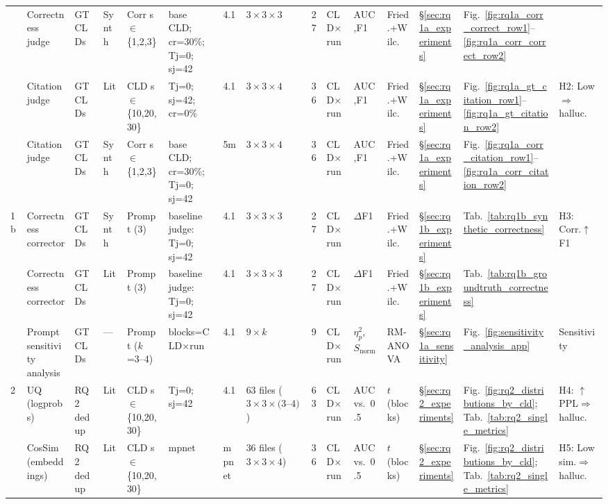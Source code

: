 \begin{landscape}
\begin{table}[H]
{\begin{tabular}{@{}l l l l l l l l c l l l l l l@{}}
  & Correctness judge & GT CLDs & Synth & Corr s$\in$\{1,2,3\} & base CLD; cr=30\%; Tj=0; sj=42 & 4.1 & $3\times3\times3$ & 27 & CLD$\times$run & AUC,F1 & Fried.+Wilc. & \S\ref{sec:rq1a_experiments} & Fig.~\ref{fig:rq1a_corr_correct_row1}--\ref{fig:rq1a_corr_correct_row2} & \\
  & Citation judge & GT CLDs & Lit & CLD s$\in$\{10,20,30\} & Tj=0; sj=42; cr=0\% & 4.1 & $3\times3\times4$ & 36 & CLD$\times$run & AUC,F1 & Fried.+Wilc. & \S\ref{sec:rq1a_experiments} & Fig.~\ref{fig:rq1a_gt_citation_row1}--\ref{fig:rq1a_gt_citation_row2} & \multirow{2}{*}{H2: Low$\Rightarrow$halluc.} \\
  & Citation judge & GT CLDs & Synth & Corr s$\in$\{1,2,3\} & base CLD; cr=30\%; Tj=0; sj=42 & 5m & $3\times3\times4$ & 36 & CLD$\times$run & AUC,F1 & Fried.+Wilc. & \S\ref{sec:rq1a_experiments} & Fig.~\ref{fig:rq1a_corr_citation_row1}--\ref{fig:rq1a_corr_citation_row2} & \\
\midrule
\multirow{2}{*}{1b}
  & Correctness corrector & GT CLDs & Synth & Prompt (3) & baseline judge: Tj=0; sj=42 & 4.1 & $3\times3\times3$ & 27 & CLD$\times$run & $\Delta$F1 & Fried.+Wilc. & \S\ref{sec:rq1b_experiments} & Tab.~\ref{tab:rq1b_synthetic_correctness} & \multirow{2}{*}{H3: Corr.$\uparrow$F1} \\
  & Correctness corrector & GT CLDs & Lit & Prompt (3) & baseline judge: Tj=0; sj=42 & 4.1 & $3\times3\times3$ & 27 & CLD$\times$run & $\Delta$F1 & Fried.+Wilc. & \S\ref{sec:rq1b_experiments} & Tab.~\ref{tab:rq1b_groundtruth_correctness} & \\
\midrule
  & Prompt sensitivity analysis & GT CLDs & --- & Prompt ($k$=3--4) & blocks=CLD$\times$run & 4.1 & $9\times k$ & 9 & CLD$\times$run & $\eta^2_p$, $S_{\text{norm}}$ & RM-ANOVA & \S\ref{sec:rq1a_sensitivity} & Fig.~\ref{fig:sensitivity_analysis_app} & Sensitivity \\
\midrule
\multirow{2}{*}{2}
  & UQ (logprobs) & RQ2 dedup & Lit & CLD s$\in$\{10,20,30\} & Tj=0; sj=42 & 4.1 & 63 files ($3\times3\times(3$--$4)$) & 63 & CLD$\times$run & AUC vs.\ 0.5 & $t$ (blocks) & \S\ref{sec:rq2_experiments} & Fig.~\ref{fig:rq2_distributions_by_cld}; Tab.~\ref{tab:rq2_single_metrics} & H4: $\uparrow$PPL$\Rightarrow$halluc. \\
  & CosSim (embeddings) & RQ2 dedup & Lit & CLD s$\in$\{10,20,30\} & mpnet & mpnet & 36 files ($3\times3\times4$) & 36 & CLD$\times$run & AUC vs.\ 0.5 & $t$ (blocks) & \S\ref{sec:rq2_experiments} & Fig.~\ref{fig:rq2_distributions_by_cld}; Tab.~\ref{tab:rq2_single_metrics} & H5: Low sim.$\Rightarrow$halluc. \\

\end{tabular}}
\end{table}
\end{landscape}

